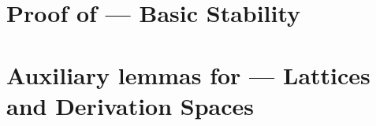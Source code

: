 \section{Proof of  --- Basic Stability}
\label{basic_stability_proof}


\section{Auxiliary lemmas for  --- Lattices and Derivation Spaces}
\label{lemmas_lattices_and_derivation_spaces_proof}



